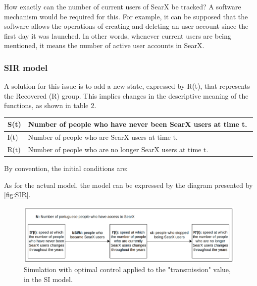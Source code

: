 \documentclass{article}
\begin{document}
How‌ ‌exactly‌ ‌can‌ ‌the‌ ‌number‌ ‌of‌ ‌current‌ ‌users‌ ‌of‌ ‌SearX‌ ‌be‌ ‌tracked? ‌A‌ ‌software‌ ‌mechanism‌‌ would‌ ‌be‌ ‌required‌ ‌for‌ ‌this.‌ ‌For‌ ‌example,‌ ‌it‌ ‌can‌ ‌be‌ ‌supposed‌ ‌that‌ ‌the‌ ‌software‌ ‌allows‌ ‌the‌‌ operations‌‌ of‌‌ creating‌‌ and‌‌ deleting‌‌ an‌‌ user‌‌ account‌‌ since‌‌ the‌‌ first‌‌ day‌‌ it‌‌ was‌‌ launched.‌‌ In‌‌ other‌‌ words,‌ ‌whenever‌ ‌current‌ ‌users‌ ‌are‌ ‌being‌ ‌mentioned,‌ ‌it‌ ‌means‌ ‌the‌ ‌number‌ ‌of‌ ‌active‌ ‌user‌‌ accounts‌ ‌in‌ ‌SearX.‌

\subsubsection{SIR‌ ‌model‌}

A‌‌ solution‌‌ for‌‌ this‌‌ issue‌‌ is‌‌ to‌‌ add‌‌ a‌‌ new‌‌ state,‌‌ expressed‌‌ by‌‌ R(t), ‌‌that‌‌ represents‌‌ the‌‌ Recovered‌‌ (R) ‌group.‌ ‌This‌ ‌implies‌ ‌changes‌ ‌in‌ ‌the‌ ‌descriptive‌ ‌meaning‌ ‌of‌ ‌the‌ ‌functions,‌ ‌as‌ ‌shown‌ ‌in‌ ‌table‌ ‌2.

\begin{tabularx}{1\textwidth} { 
    | >{\centering\arraybackslash}X 
    || >{\centering\arraybackslash}X | }
   \hline
   S(t) & Number‌ ‌of‌ ‌people‌ ‌who‌ ‌have‌ ‌never‌ ‌been‌ ‌SearX‌ ‌users‌ ‌at‌ ‌time‌ ‌t.‌ ‌\\
   \hline
   I(t)  & Number‌ ‌of‌ ‌people‌ ‌who‌ ‌are‌ ‌SearX‌ ‌users‌ ‌at‌ ‌time‌ ‌t.‌ \\
   \hline
   R(t)  & Number‌ ‌of‌ ‌people‌ ‌who‌ ‌are‌ ‌no‌ ‌longer‌ ‌SearX‌ ‌users‌ ‌at‌ ‌time‌ ‌t.‌ \\
  \hline
\end{tabularx}

By‌ ‌convention,‌ ‌the‌ ‌initial‌ ‌conditions‌ ‌are:‌ ‌


As‌ ‌for‌ ‌the‌ ‌actual‌ ‌model,‌ ‌the‌ ‌model‌ ‌can‌ ‌be‌ ‌expressed‌ ‌by‌ ‌the‌ ‌diagram‌ ‌presented‌ ‌by‌ \autoref{fig:SIR}.

\begin{figure}[h]
    \centering
    \includegraphics[width=0.7\linewidth]{SIR}
    \caption{‌‌Simulation‌ ‌with‌ ‌optimal‌ ‌control‌ ‌applied‌ ‌to‌ ‌the‌ ‌"transmission"‌ ‌value,‌ ‌in‌ ‌the‌ ‌SI‌ ‌model.‌‌‌}
    \label{fig:SIR}
\end{figure}
\end{document}
